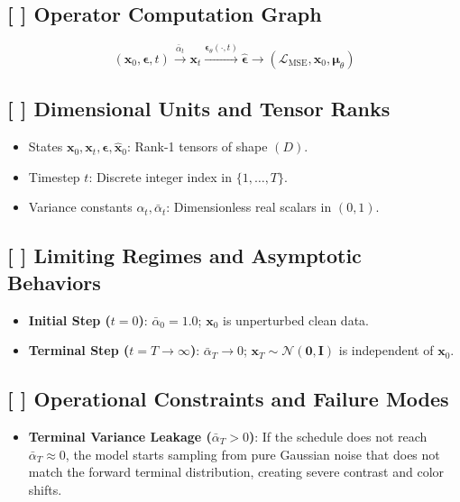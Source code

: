 \documentclass[11pt,a4paper]{article}
\theoremstyle{definition}
\begin{document}
\subsection{[ ] Operator Computation Graph}
{\boldmath
\begin{equation}
(\mathbf{x}_0, \boldsymbol{\epsilon}, t) \xrightarrow{\bar{\alpha}_t} \mathbf{x}_t \xrightarrow{\boldsymbol{\epsilon}_\theta(\cdot, t)} \hat{\boldsymbol{\epsilon}} \longrightarrow (\mathcal{L}_{\text{MSE}}, \hat{\mathbf{x}}_0, \boldsymbol{\mu}_\theta)
\end{equation}
}

\subsection{[ ] Dimensional Units and Tensor Ranks}
\begin{itemize}
    \item States $\mathbf{x}_0, \mathbf{x}_t, \boldsymbol{\epsilon}, \hat{\mathbf{x}}_0$: Rank-1 tensors of shape $(D)$.
    \item Timestep $t$: Discrete integer index in $\{1, \dots, T\}$.
    \item Variance constants $\alpha_t, \bar{\alpha}_t$: Dimensionless real scalars in $(0, 1)$.
\end{itemize}

\subsection{[ ] Limiting Regimes and Asymptotic Behaviors}
\begin{itemize}
    \item \textbf{Initial Step ($t = 0$)}: $\bar{\alpha}_0 = 1.0$; $\mathbf{x}_0$ is unperturbed clean data.
    \item \textbf{Terminal Step ($t = T \to \infty$)}: $\bar{\alpha}_T \to 0$; $\mathbf{x}_T \sim \mathcal{N}(\mathbf{0}, \mathbf{I})$ is independent of $\mathbf{x}_0$.
\end{itemize}

\subsection{[ ] Operational Constraints and Failure Modes}
\begin{itemize}
    \item \textbf{Terminal Variance Leakage ($\bar{\alpha}_T > 0$)}: If the schedule does not reach $\bar{\alpha}_T \approx 0$, the model starts sampling from pure Gaussian noise that does not match the forward terminal distribution, creating severe contrast and color shifts.
\end{itemize}
\end{document}
